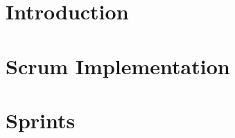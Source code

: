 \documentclass[12pt,                                          %
               a4paper,                                       %
               openany                                 %
              ]{report}                               %
\begin{document}
\setcounter{page}{1}                                          %

\tableofcontents                                              %
\listoftables    
\printglossary
\printglossary[type=\acronymtype]
\newpage                                                       


\pagestyle{fancy}                                             %
\chapter[Introduction]{Introduction}                          %
\label{chap:intro}                                            %

\chapter[Scrum Implementation]{Scrum Implementation}           %
\label{chap:scrumimplementation}

\chapter{Sprints}                                              %
\label{chap:sprints}                                           %
\end{document}
